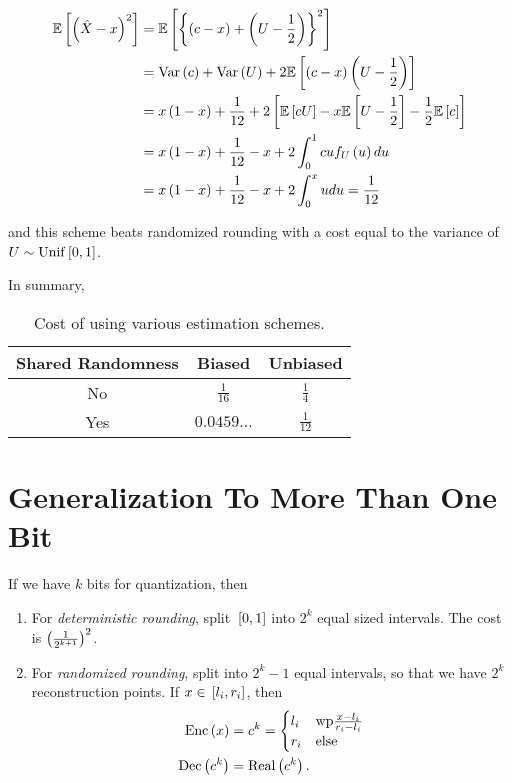 \documentclass[twoside]{article}
\begin{document}
\begin{align}
    \mathbb{E}\left[ \left(\hat{X}-x\right)^2 \right] &= \mathbb{E}\left[ \left\{\left(c-x\right)+\left(U-\frac{1}{2}\right)\right\}^2 \right] \\
                              &= \mathrm{Var}\left(c\right) + \mathrm{Var}\left(U\right) + 2\mathbb{E}\left[ \left(c-x\right)\left(U-\frac{1}{2}\right) \right] \\
                              &= x\left(1-x\right) + \frac{1}{12} + 2{}\left[\mathbb{E}\left[ cU \right]-x\mathbb{E}\left[ U-\frac{1}{2} \right]-\frac{1}{2}\mathbb{E}\left[ c \right]\right] \\
                              &= x\left(1-x\right) + \frac{1}{12} - x + 2\int_0^1cuf_U\left(u\right)du \\
                              &= x\left(1-x\right) + \frac{1}{12} - x + 2\int_0^xudu = \frac{1}{12}
\end{align}

and this scheme beats randomized rounding with a cost equal to the variance of \(U\sim\mathrm{Unif}{}\left[0,1\right]\).

In summary,

\begin{table}[!ht]
    \centering
    \begin{tabular}{|c|c|c|}
        \hline
        \textbf{Shared Randomness} & \textbf{Biased} & \textbf{Unbiased} \\
        \hline
        No & \(\frac{1}{16}\) & \(\frac{1}{4}\) \\
        \hline
        Yes & \(0.0459\ldots\) & \(\frac{1}{12}\) \\
        \hline
    \end{tabular}
    \caption{Cost of using various estimation schemes.}
    \label{tab:cost-est}
\end{table}

\section{Generalization To More Than One Bit}

If we have \(k\) bits for quantization, then

\begin{enumerate}
    \item For \emph{deterministic rounding}, split \({}\left[0,1\right]\) into \(2^k\) equal sized intervals. The cost is \(\left(\frac{1}{2^{k+1}}\right)^2\).
    \item For \emph{randomized rounding}, split into \(2^k-1\) equal intervals, so that we have \(2^k\) reconstruction points. If \(x\in{}\left[l_i,r_i\right]\), then
        \begin{align}
            \mathrm{Enc}\left(x\right) &= c^k =
            \begin{cases}
                l_i & \textrm{wp} \frac{x-l_i}{r_i-l_i} \\
                r_i & \textrm{else}
            \end{cases} \label{eq:rand-enc-gen} \\
            \mathrm{Dec}\left(c^k\right) &= \mathrm{Real}\left(c^k\right).
            \label{eq:rand-dec-gen}
        \end{align}
\end{enumerate}
\end{document}
